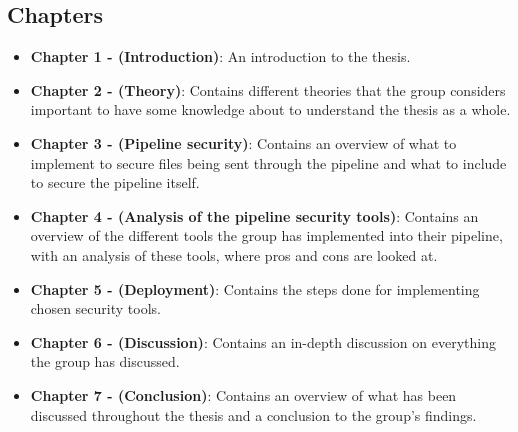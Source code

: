 
\subsection{Chapters}
\begin{itemize}
    \item \textbf{Chapter 1 - (Introduction)}: An introduction to the thesis.
    \item \textbf{Chapter 2 - (Theory)}: Contains different theories that the group considers important 
    to have some knowledge about to understand the thesis as a whole.
    \item \textbf{Chapter 3 - (Pipeline security)}: Contains an overview of what to implement to secure files being sent through the pipeline and what to include to secure the pipeline itself. 
    \item \textbf{Chapter 4 - (Analysis of the pipeline security tools)}: Contains an overview of the different tools the group has implemented into their pipeline, with an analysis of these tools, where pros and cons are looked at. 
    \item \textbf{Chapter 5 - (Deployment)}: Contains the steps done for implementing chosen security tools. 
    \item \textbf{Chapter 6 - (Discussion)}: Contains an in-depth discussion on everything the group has discussed. 
    \item \textbf{Chapter 7 - (Conclusion)}: Contains an overview of what has been discussed throughout the thesis and a conclusion to the group's findings. 

\end{itemize}






